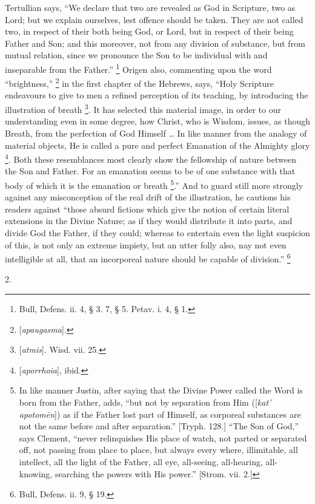 Tertullian says, ``We declare that two are revealed as God in
Scripture, two as Lord; but we explain ourselves, lest offence should
be taken. They are not called two, in respect of their both being God,
or Lord, but in respect of their being Father and Son; and this
moreover, not from any division of substance, but from mutual
relation, since we pronounce the Son to be individual with and
inseparable from the Father.'' \footnote{Bull, Defens. ii. 4, § 3. 7, § 5. Petav.
i. 4, § 1.} Origen also, commenting upon the word ``brightness,'' \footnote{[\emph{apaugasma}].}
in the first chapter of the Hebrews, says, ``Holy Scripture
endeavours to give to men a refined perception of its teaching, by
introducing the illustration of breath \footnote{[\emph{atmis}]. Wisd. vii. 25.}. It has selected this material image, in order to our
understanding even in some degree, how Christ, who is Wisdom, issues,
as though Breath, from the perfection of God Himself … In like
manner from the analogy of material objects, He is called a pure and
perfect Emanation of the Almighty glory \footnote{[\emph{aporrhoia}], ibid.}. Both these resemblances most clearly show the fellowship of
nature between the Son and Father. For an emanation seems to be of one
substance with that body of which it is the emanation or breath \footnote{In like manner Justin, after saying that
the Divine Power called the Word is born from the Father, adds,
``but not by separation from Him ([\emph{kat' apotom\={e}n}])
as if the Father lost part of Himself, as corporeal substances are not
the same before and after separation.'' [Tryph. 128.] ``The
Son of God,'' says Clement, ``never relinquishes His place of
watch, not parted or separated off, not passing from place to place,
but always every where, illimitable, all intellect, all the light of
the Father, all eye, all-seeing, all-hearing, all-knowing, searching
the powers with His power.'' [Strom. vii. 2.]}.'' And to guard still more strongly against any
misconception of the real drift of the illustration, he cautions his
readers against ``those absurd fictions which give the notion of
certain literal extensions in the Divine Nature; as if they would
distribute it into parts, and divide God the Father, if they could;
whereas to entertain even the light suspicion of this, is not only an
extreme impiety, but an utter folly also, nay not even intelligible
at all, that an incorporeal nature should be capable of
division.'' \footnote{Bull, Defens. ii. 9, § 19.}

2.

